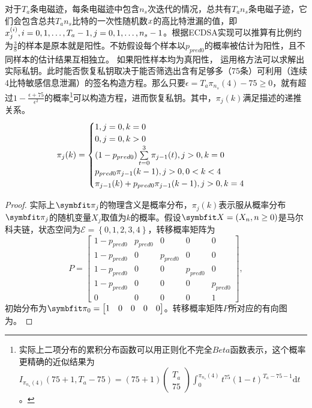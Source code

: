 {	\begin{proposition}\label{prop:highalpha}
		对于$T_a$条电磁迹，每条电磁迹中包含$n_s$次迭代的情况，总共有$T_an_s$条电磁子迹，它们会包含总共$T_an_s$比特的一次性随机数$x$的高比特泄漏的值，即$x^{(i)}_j,i=0,1,\dots,T_a-1,j=0,1,\dots,n_s-1$。根据ECDSA实现可以推算有比例约为$\frac38$的样本是原本就是阳性。不妨假设每个样本以$p_{pred0}$的概率被估计为阳性，且不同样本的估计结果互相独立。
		如果阳性样本均为真阳性，
		运用格方法可以求解出实际私钥。此时能否恢复私钥取决于能否筛选出含有足够多（75条）可利用（连续4比特敏感信息泄漏）的签名构造方程。那么只要$\epsilon=T_a\pi_{n_s}(4)-75\ge0$，就有超过$1-\frac{\epsilon+75}{\epsilon^2}$的概率\footnote{实际上二项分布的累积分布函数可以用正则化不完全$Beta$函数表示，这个概率更精确的近似结果为$I_{\pi_{n_s}(4)}(75+1,T_a-75)=(75+1)\begin{pmatrix}T_a\\75\end{pmatrix}\int_0^{\pi_{n_s}(4)}t^{75}(1-t)^{T_a-75-1}\mathrm dt$。}可以构造方程，进而恢复私钥。其中，$\pi_{j}(k)$满足描述的递推关系。
		\begin{equation}\label{eq:recursion}
			\pi_{j}(k)=\begin{cases}
				1,j=0,k=0\\
				0,j=0,k>0\\
				(1-p_{pred0})\sum\limits_{t=0}^{3}\pi_{j-1}(t),j>0,k=0\\
				p_{pred0}\pi_{j-1}(k-1),j>0,0<k<4\\
				\pi_{j-1}(k)+p_{pred0}\pi_{j-1}(k-1),j>0,k=4
			\end{cases}\\
		\end{equation}
	\end{proposition}
	\begin{proof}
	实际上$\Vector{\pi_j}$的物理含义是概率分布，$\pi_j(k)$表示服从概率分布$\Vector\pi_j$的随机变量$X_j$取值为$k$的概率。假设$\Vector X=(X_n,n\ge0)$是马尔科夫链，状态空间为$\mathcal E=\left\lbrace 0,1,2,3,4\right\rbrace $，转移概率矩阵为$$P=\begin{bmatrix}
	1-p_{pred0}&p_{pred0}&0&0&0\\
	1-p_{pred0}&0&p_{pred0}&0&0\\
	1-p_{pred0}&0&0&p_{pred0}&0\\
	1-p_{pred0}&0&0&0&p_{pred0}\\
	0&0&0&0&1
	\end{bmatrix},$$初始分布为$\Vector\pi_0=\begin{bmatrix}
	1&0&0&0&0
	\end{bmatrix}$。转移概率矩阵$P$所对应的有向图为。
	

\end{proof}}
